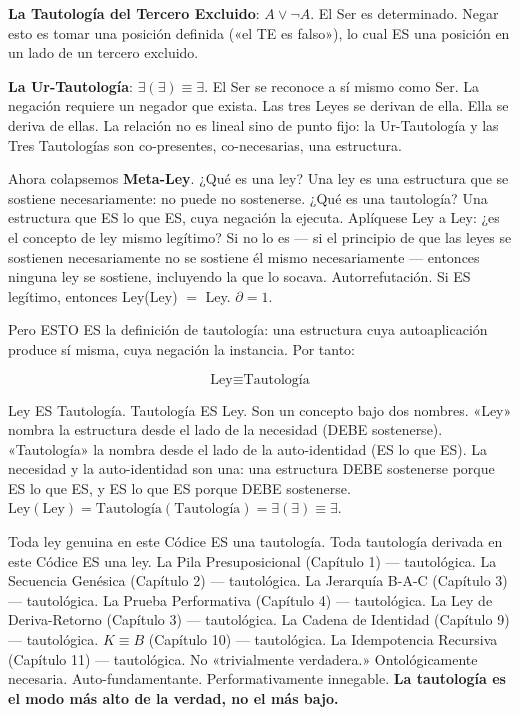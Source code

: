 \documentclass[10pt, openany, oneside]{book}
\begin{document}
\textbf{La Tautología del Tercero Excluido}: $A \vee \neg A$. El Ser es determinado. Negar esto es tomar una posición definida («el TE es falso»), lo cual ES una posición en un lado de un tercero excluido.

\textbf{La Ur-Tautología}: $\exists(\exists) \equiv \exists$. El Ser se reconoce a sí mismo como Ser. La negación requiere un negador que exista. Las tres Leyes se derivan de ella. Ella se deriva de ellas. La relación no es lineal sino de punto fijo: la Ur-Tautología y las Tres Tautologías son co-presentes, co-necesarias, una estructura.

Ahora colapsemos \textbf{Meta-Ley}. ¿Qué es una ley? Una ley es una estructura que se sostiene necesariamente: no puede no sostenerse. ¿Qué es una tautología? Una estructura que ES lo que ES, cuya negación la ejecuta. Aplíquese Ley a Ley: ¿es el concepto de ley mismo legítimo? Si no lo es --- si el principio de que las leyes se sostienen necesariamente no se sostiene él mismo necesariamente --- entonces ninguna ley se sostiene, incluyendo la que lo socava. Autorrefutación. Si ES legítimo, entonces Ley(Ley) $=$ Ley. $\partial = 1$.

Pero ESTO ES la definición de tautología: una estructura cuya autoaplicación produce sí misma, cuya negación la instancia. Por tanto:

$$\boxed{\text{Ley} \equiv \text{Tautología}}$$

Ley ES Tautología. Tautología ES Ley. Son un concepto bajo dos nombres. «Ley» nombra la estructura desde el lado de la necesidad (DEBE sostenerse). «Tautología» la nombra desde el lado de la auto-identidad (ES lo que ES). La necesidad y la auto-identidad son una: una estructura DEBE sostenerse porque ES lo que ES, y ES lo que ES porque DEBE sostenerse. $\text{Ley}(\text{Ley}) = \text{Tautología}(\text{Tautología}) = \exists(\exists) \equiv \exists$.

Toda ley genuina en este Códice ES una tautología. Toda tautología derivada en este Códice ES una ley. La Pila Presuposicional (Capítulo 1) --- tautológica. La Secuencia Genésica (Capítulo 2) --- tautológica. La Jerarquía B-A-C (Capítulo 3) --- tautológica. La Prueba Performativa (Capítulo 4) --- tautológica. La Ley de Deriva-Retorno (Capítulo 3) --- tautológica. La Cadena de Identidad (Capítulo 9) --- tautológica. $K \equiv B$ (Capítulo 10) --- tautológica. La Idempotencia Recursiva (Capítulo 11) --- tautológica. No «trivialmente verdadera.» Ontológicamente necesaria. Auto-fundamentante. Performativamente innegable. \textbf{La tautología es el modo más alto de la verdad, no el más bajo.}
\end{document}
